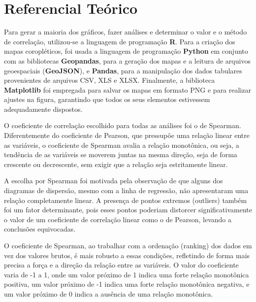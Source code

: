 \chapter{Referencial Teórico}

Para gerar a maioria dos gráficos, fazer análises e determinar o valor e o método de correlação, utilizou-se a linguagem de programação \textbf{R}. Para a criação dos mapas coropléticos, foi usada a linguagem de programação \textbf{Python} em conjunto com as bibliotecas \textbf{Geopandas}, para a geração dos mapas e a leitura de arquivos geoespaciais (\textbf{GeoJSON}), e \textbf{Pandas}, para a manipulação dos dados tabulares provenientes de arquivos CSV, XLS e XLSX. Finalmente, a biblioteca \textbf{Matplotlib} foi empregada para salvar os mapas em formato PNG e para realizar ajustes na figura, garantindo que todos os seus elementos estivessem adequadamente dispostos.

O coeficiente de correlação escolhido para todas as análises foi o de Spearman. Diferentemente do coeficiente de Pearson, que pressupõe uma relação linear entre as variáveis, o coeficiente de Spearman avalia a relação monotônica, ou seja, a tendência de as variáveis se moverem juntas na mesma direção, seja de forma crescente ou decrescente, sem exigir que a relação seja estritamente linear.

A escolha por Spearman foi motivada pela observação de que alguns dos diagramas de dispersão, mesmo com a linha de regressão, não apresentaram uma relação completamente linear. A presença de pontos extremos (outliers) também foi um fator determinante, pois esses pontos poderiam distorcer significativamente o valor de um coeficiente de correlação linear como o de Pearson, levando a conclusões equivocadas. 

O coeficiente de Spearman, ao trabalhar com a ordenação (ranking) dos dados em vez dos valores brutos, é mais robusto a essas condições, refletindo de forma mais precisa a força e a direção da relação entre as variáveis. O valor do coeficiente varia de -1 a 1, onde um valor próximo de 1 indica uma forte relação monotônica positiva, um valor próximo de -1 indica uma forte relação monotônica negativa, e um valor próximo de 0 indica a ausência de uma relação monotônica.
